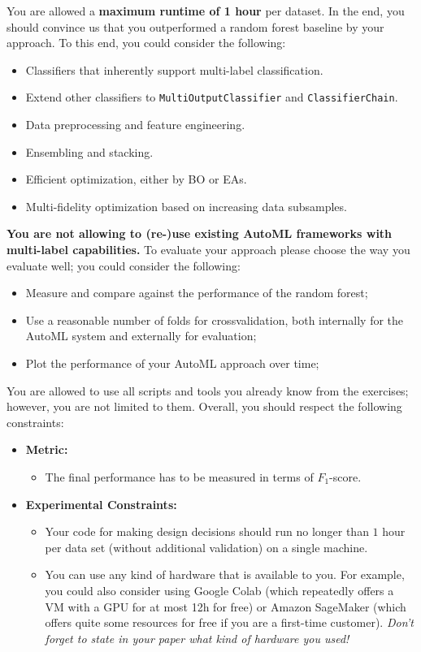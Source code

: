 \documentclass[10pt,a4paper]{article}
\begin{document}
        You are allowed a \textbf{maximum runtime of 1 hour} per dataset.
		In the end, you should convince us that you outperformed a random forest baseline by your approach.
		To this end, you could consider the following:
		\begin{itemize}
			\item Classifiers that inherently support multi-label classification.
            \item Extend other classifiers to \texttt{MultiOutputClassifier} and \texttt{ClassifierChain}.
            \item Data preprocessing and feature engineering.
			\item Ensembling and stacking.
			\item Efficient optimization, either by BO or EAs.
			\item Multi-fidelity optimization based on increasing data subsamples.
		\end{itemize}
		\textbf{You are not allowing to (re-)use existing AutoML frameworks with multi-label capabilities.}
		\noindent
		To evaluate your approach please choose the way you evaluate well; you could consider the following:
		\begin{itemize}
			\item Measure and compare against the performance of the random forest;
			\item Use a reasonable number of folds for crossvalidation, both internally for the AutoML system and externally for evaluation;
			\item Plot the performance of your AutoML approach over time;
		\end{itemize}

		You are allowed to use all scripts and tools you already know from the exercises; however, you are not limited to them.
		Overall, you should respect the following constraints:
		\begin{itemize}
			\item \textbf{Metric:}
			\begin{itemize}
				\item The final performance has to be measured in terms of $F_1$-score.
			\end{itemize}
			\item \textbf{Experimental Constraints:}
			\begin{itemize}
				\item Your code for making design decisions should run no longer than $1$ hour per data set (without additional validation) on a single machine.
				\item You can use any kind of hardware that is available to you. For example, you could also consider using Google Colab (which repeatedly offers a VM with a GPU for at most 12h for free) or Amazon SageMaker (which offers quite some resources for free if you are a first-time customer). \textit{Don't forget to state in your paper what kind of hardware you used!}
			\end{itemize}
		\end{itemize}


        \gccs

		\newpage
		\grading


\end{document}
